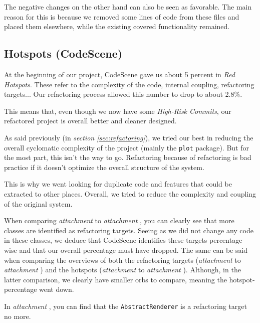 \documentclass[11pt]{article}
\begin{document}
	The negative changes on the other hand can also be seen as favorable. The main reason for this is because we removed some lines of code from these files and placed them elsewhere, while the existing covered functionality remained.
	
	\subsection{Hotspots (CodeScene)}
	At the beginning of our project, \textsf{CodeScene} gave us about 5 percent in \textsl{Red Hotspots}. These refer to the complexity of the code, internal coupling, refactoring targets... Our refactoring process allowed this number to drop to about 2.8\%.
	
	This means that, even though we now have some \textsl{High-Risk Commits}, our refactored project is overall better and cleaner designed.
	
	As said previously (in \textsl{section \ref{sec:refactoring}}), we tried our best in reducing the overall cyclomatic complexity of the project (mainly the \texttt{plot} package). But for the most part, this isn't the way to go. Refactoring because of refactoring is bad practice if it doesn't optimize the overall structure of the system.
	
	This is why we went looking for duplicate code and features that could be extracted to other places. Overall, we tried to reduce the complexity and coupling of the original system.
	
	When comparing \textsl{attachment \pageref{refactoring-package-plot}} to \textsl{attachment \pageref{refactoring-package-plot-ours}}, you can clearly see that more classes are identified as refactoring targets. Seeing as we did not change any code in these classes, we deduce that \textsf{CodeScene} identifies these targets percentage-wise and that our overall percentage must have dropped. The same can be said when comparing the overviews of both the refactoring targets (\textsl{attachment \pageref{refactoring-overview}} to \textsl{attachment \pageref{refactoring-overview-ours}}) and the hotspots (\textsl{attachment \pageref{hotspots-overview}} to \textsl{attachment \pageref{hotspots-overview-ours}}). Although, in the latter comparison, we clearly have smaller orbs to compare, meaning the hotspot-percentage went down.
	
	In \textsl{attachment \pageref{refactoring-package-renderer-ours}}, you can find that the \texttt{AbstractRenderer} is a refactoring target no more.
	
\end{document}
